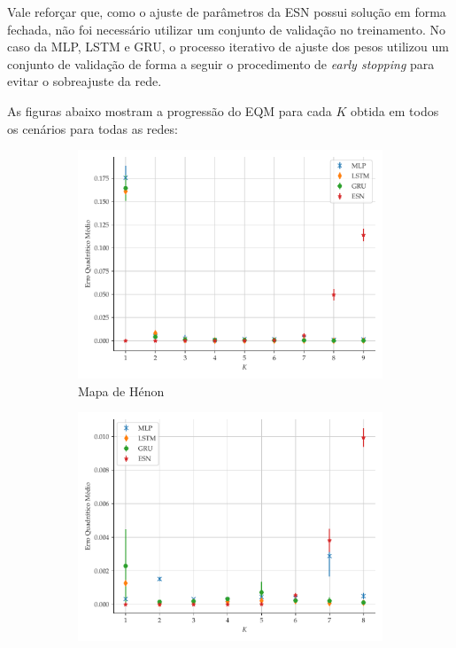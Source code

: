 \documentclass[9pt, technote]{article}
\begin{document}
Vale reforçar que, como o ajuste de parâmetros da ESN possui solução em forma fechada, não foi necessário utilizar um conjunto de validação no treinamento. No caso da MLP, LSTM e GRU, o processo iterativo de ajuste dos pesos utilizou um conjunto de validação de forma a seguir o procedimento de \textit{early stopping} para evitar o sobreajuste da rede.

As figuras abaixo mostram a progressão do EQM para cada $K$ obtida em todos os cenários para todas as redes:
\begin{figure}[H]
     \begin{subfigure}[t]{0.24\textwidth}
         \includegraphics[scale=0.24]{progressao-k-henon.pdf}
         \caption{Mapa de Hénon}
     \end{subfigure}
     \centering
     \begin{subfigure}[t]{0.24\textwidth} 
         \includegraphics[scale=0.24]{progressao-k-logistic.pdf}

\end{subfigure}
\end{figure}
\end{document}

